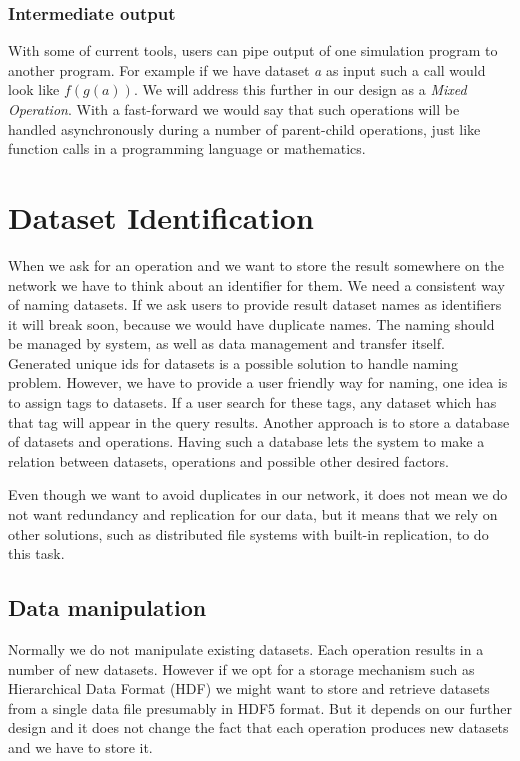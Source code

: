 \subsubsection{Intermediate output}
With some of current tools, users can pipe output of one simulation program to another program.
For example if we have dataset \textit{a} as input such a call would look like \(f(g(a))\). 
We will address this further in our design as a \textit{Mixed Operation}.
With a fast-forward we would say that such operations will be handled asynchronously during a number of parent-child operations,
just like function calls in a programming language or mathematics.

\section{Dataset Identification}
When we ask for an operation and we want to store the result somewhere on the network we have to think about an identifier
for them. 
We need a consistent way of naming datasets. If we ask users to provide result dataset names as identifiers it will break soon, because we
would have duplicate names. The naming should be managed by system, as well as data management and transfer itself. 
Generated unique ids for datasets is a possible solution to handle naming problem. 
However, we have to provide a user friendly way for naming, one idea is to assign tags to datasets. If a user search for
these tags, any dataset which has that tag will appear in the query results.
Another approach is to store a database of datasets and operations. Having such a database lets the system to make a relation
between datasets, operations and possible other desired factors.

Even though we want to avoid duplicates in our network, it does not mean we do not want redundancy and replication for our 
data, but it means that we rely on other solutions, such as distributed file systems with built-in replication, to do this task.

\subsection{Data manipulation}
Normally we do not manipulate existing datasets. Each operation results in a number of new datasets. However if we
opt for a storage mechanism such as Hierarchical Data Format (HDF) we might want to store and retrieve datasets from
a single data file presumably in HDF5 format. But it depends on our further design and it does not change the fact
that each operation produces new datasets and we have to store it.

